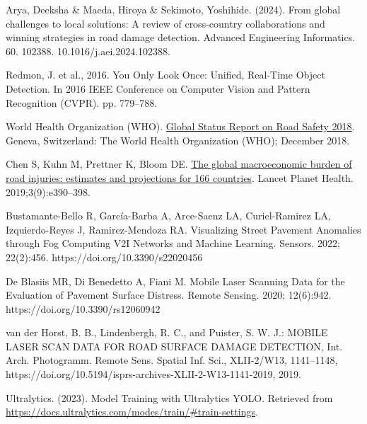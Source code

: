 \begin{thebibliography}{10}
        Arya, Deeksha \& Maeda, Hiroya \& Sekimoto, Yoshihide. (2024). From global challenges to local solutions: A review of cross-country collaborations and winning strategies in road damage detection. Advanced Engineering Informatics. 60. 102388. 10.1016/j.aei.2024.102388. 

        Redmon, J. et al., 2016. You Only Look Once: Unified, Real-Time Object Detection. In 2016 IEEE Conference on Computer Vision and Pattern Recognition (CVPR). pp. 779–788.

        World Health Organization (WHO). \href{https://www.who.int/publications/i/item/9789241565684}{Global Status Report on Road Safety 2018}. Geneva, Switzerland: The World Health Organization (WHO); December 2018.
        
        Chen S, Kuhn M, Prettner K, Bloom DE. \href{https://www.sciencedirect.com/science/article/pii/S2542519619301706}{The global macroeconomic burden of road injuries: estimates and projections for 166 countries}. Lancet Planet Health. 2019;3(9):e390–398.

        Bustamante-Bello R, García-Barba A, Arce-Saenz LA, Curiel-Ramirez LA, Izquierdo-Reyes J, Ramirez-Mendoza RA. Visualizing Street Pavement Anomalies through Fog Computing V2I Networks and Machine Learning. Sensors. 2022; 22(2):456. https://doi.org/10.3390/s22020456

        De Blasiis MR, Di Benedetto A, Fiani M. Mobile Laser Scanning Data for the Evaluation of Pavement Surface Distress. Remote Sensing. 2020; 12(6):942. https://doi.org/10.3390/rs12060942

        van der Horst, B. B., Lindenbergh, R. C., and Puister, S. W. J.: MOBILE LASER SCAN DATA FOR ROAD SURFACE DAMAGE DETECTION, Int. Arch. Photogramm. Remote Sens. Spatial Inf. Sci., XLII-2/W13, 1141–1148, https://doi.org/10.5194/isprs-archives-XLII-2-W13-1141-2019, 2019.

        Ultralytics. (2023). Model Training with Ultralytics YOLO.
        Retrieved from \url{https://docs.ultralytics.com/modes/train/#train-settings}.

  \end{thebibliography}
  